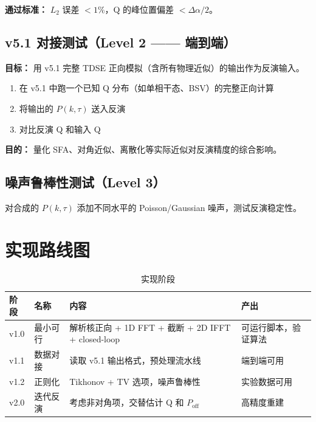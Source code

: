 \documentclass[11pt,a4paper]{ctexart}
\begin{document}
\textbf{通过标准：} $L_2$ 误差 $< 1\%$，Q 的峰位置偏差 $< \Delta\alpha/2$。

\subsection{v5.1 对接测试（Level 2 —— 端到端）}

\textbf{目标：} 用 v5.1 完整 TDSE 正向模拟（含所有物理近似）的输出作为反演输入。

\begin{enumerate}
    \item 在 v5.1 中跑一个已知 Q 分布（如单相干态、BSV）的完整正向计算
    \item 将输出的 $P(k,\tau)$ 送入反演
    \item 对比反演 Q 和输入 Q
\end{enumerate}

\textbf{目的：} 量化 SFA、对角近似、离散化等实际近似对反演精度的综合影响。

\subsection{噪声鲁棒性测试（Level 3）}

对合成的 $P(k,\tau)$ 添加不同水平的 Poisson/Gaussian 噪声，测试反演稳定性。

\section{实现路线图}

\begin{table}[H]
\centering
\caption{实现阶段}
\begin{tabular}{p{1cm}p{3cm}p{4cm}p{4.5cm}}
\toprule
\textbf{阶段} & \textbf{名称} & \textbf{内容} & \textbf{产出} \\
\midrule
v1.0 & 最小可行 & 解析核正向 + 1D FFT + 截断 + 2D IFFT + closed-loop & 可运行脚本，验证算法 \\
\midrule
v1.1 & 数据对接  & 读取 v5.1 输出格式，预处理流水线 & 端到端可用 \\
\midrule
v1.2 & 正则化    & Tikhonov + TV 选项，噪声鲁棒性 & 实验数据可用 \\
\midrule
v2.0 & 迭代反演  & 考虑非对角项，交替估计 Q 和 $P_{\text{off}}$ & 高精度重建 \\
\bottomrule
\end{tabular}
\end{table}
\end{document}
